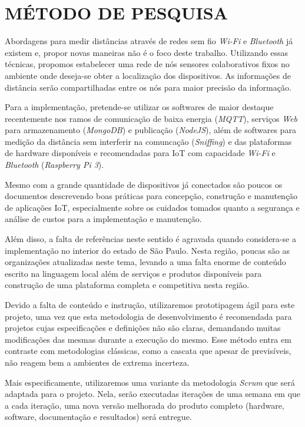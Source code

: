 
\chapter{MÉTODO DE PESQUISA}
\label{chap:MÉTODO DE PESQUISA}

Abordagens para medir distâncias através de redes sem fio 	\textit{Wi-Fi}
\cite{bahillo2009ieee} e \textit{Bluetooth} já existem e, propor novas maneiras não é o
foco deste trabalho. Utilizando essas técnicas, propomos estabelecer uma rede de
nós sensores colaborativos fixos no ambiente onde deseja-se obter a localização
dos dispositivos. As informações de distância serão compartilhadas entre os nós
para maior precisão da informação.

Para a implementação, pretende-se utilizar os softwares de maior destaque
recentemente nos ramos de comunicação de baixa energia (\textit{MQTT}), serviços
\textit{Web} para armazenamento (\textit{MongoDB}) e publicação
(\textit{NodeJS}), além de softwares para medição da distância sem interferir na
comuncação (\textit{Sniffing}) e das plataformas de hardware disponíveis e
recomendadas para IoT com capacidade 	\textit{Wi-Fi} e \textit{Bluetooth} (\textit{Raspberry Pi
3}).

Mesmo com a grande quantidade de dispositivos já conectados são poucos os
documentos descrevendo boas práticas para concepção, construção e manutenção de
aplicações IoT, especialmente sobre os cuidados tomados quanto a segurança e
análise de custos para a implementação e manutenção.

Além disso, a falta de referências neste sentido é agravada quando considera-se
a implementação no interior do estado de São Paulo. Nesta região, poucas são as
organizações atualizadas neste tema, levando a uma falta enorme de conteúdo
escrito na linguagem local além de serviços e produtos disponíveis para
construção de uma plataforma completa e competitiva nesta região.

Devido a falta de conteúdo e instrução, utilizaremos prototipagem ágil para este
projeto, uma vez que esta metodologia de desenvolvimento é recomendada para
projetos cujas especificações e definições não são claras, demandando muitas
modificações das mesmas durante a execução do mesmo. Esse método entra em
contraste com metodologias clássicas, como a cascata que apesar de previsíveis,
não reagem bem a ambientes de extrema incerteza.

Mais especificamente, utilizaremos uma variante da metodologia \textit{Scrum}
\cite{James2016} que será adaptada para o projeto. Nela, serão executadas
iterações de uma semana em que a cada iteração, uma nova versão melhorada do
produto completo (hardware, software, documentação e resultados) será entregue.

